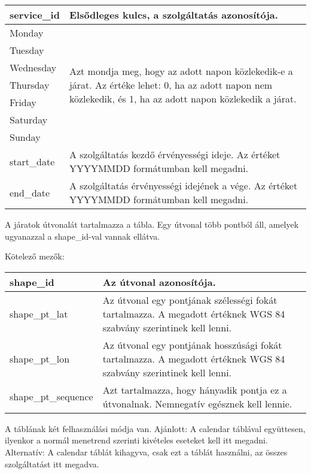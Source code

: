 \begin{tabular}{|p{3.5cm}|p{10cm}|}
\hline
service\_id & Elsődleges kulcs, a szolgáltatás azonosítója. \\
\hline
Monday & \multirow{7}{10cm}{Azt mondja meg, hogy az adott napon közlekedik-e a járat.
Az értéke lehet:
0, ha az adott napon nem közlekedik, és
1, ha az adott napon közlekedik a járat.} \\
\cline{1-1}
Tuesday & \\
\cline{1-1}
Wednesday & \\
\cline{1-1}
Thursday & \\
\cline{1-1}
Friday & \\
\cline{1-1}
Saturday & \\
\cline{1-1}
Sunday & \\
\hline
start\_date & A szolgáltatás kezdő érvényességi ideje. Az értéket YYYYMMDD formátumban kell megadni. \\
\hline
end\_date & A szolgáltatás érvényességi idejének a vége. Az értéket YYYYMMDD formátumban kell megadni. \\
\hline
\end{tabular}



A járatok útvonalát tartalmazza a tábla. Egy útvonal több pontból áll, amelyek ugyanazzal a shape\_id-val vannak ellátva.

\medskip

\noindent Kötelező mezők:

\bigskip

\begin{tabular}{|p{3.7cm}|p{9.8cm}|}
\hline
shape\_id & Az útvonal azonosítója. \\
\hline
shape\_pt\_lat & Az útvonal egy pontjának szélességi fokát tartalmazza. A megadott értéknek WGS 84 szabvány szerintinek kell lenni. \\
\hline
shape\_pt\_lon & Az útvonal egy pontjának hosszúsági fokát tartalmazza. A megadott értéknek WGS 84 szabvány szerintinek kell lenni. \\
\hline
shape\_pt\_sequence & Azt tartalmazza, hogy hányadik pontja ez a útvonalnak. Nemnegatív egésznek kell lennie. \\
\hline
\end{tabular}


A táblának két felhasználási módja van.
Ajánlott: A calendar táblával együttesen, ilyenkor a normál menetrend szerinti kivételes eseteket kell itt megadni.
Alternatív: A calendar táblát kihagyva, csak ezt a táblát használni, az összes szolgáltatást itt megadva. 

